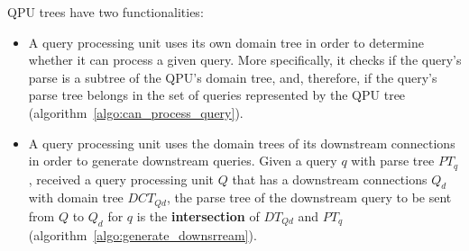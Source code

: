 




QPU trees have two functionalities:
\begin{itemize}
  \item A query processing unit uses its own domain tree in order to determine whether it can process a given query.
  More specifically, it checks if the query's parse is a subtree of the QPU's domain tree,
  and, therefore, if the query's parse tree belongs in the set of queries represented by the QPU tree
  (algorithm~\ref{algo:can_process_query}).

  \item A query processing unit uses the domain trees of its downstream connections in order to generate downstream queries.
  Given a query $q$ with parse tree $PT_q$, received a query processing unit $Q$ that has a downstream connections $Q_d$
  with domain tree $DCT_{Qd}$, the parse tree of the downstream query to be sent from $Q$ to $Q_d$ for $q$ is the
  \textbf{intersection} of $DT_{Qd}$ and $PT_q$
  (algorithm~\ref{algo:generate_downsrream}).
\end{itemize}

